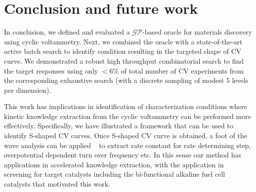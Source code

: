 


\section{Conclusion and future work}
In conclusion, we defined and evaluated a \(\mathcal{GP}\)-based oracle for materials discovery using cyclic voltammetry.
Next, we combined the oracle with a state-of-the-art active batch search to identify condition resulting in the targeted shape of CV curve. 
We demonstrated a robust high throughput combinatorial search to find the target responses using only \(<6\%\) of total number of CV experiments from the corresponding exhaustive search (with a discrete sampling of modest 5 levels per dimension). 

This work has implications in identification of characterization conditions where kinetic knowledge extraction from the cyclic voltammetry can be preformed more effectively. 
Specifically, we have illustrated a framework that can be used to identify S-shaped CV curves. 
Once S-shaped CV curve is obtained, a foot of the wave analysis can be applied ~\cite{FOWA} to extract rate constant for rate determining step, overpotential dependent turn over frequency etc.
In this sense our method has applications in accelerated knowledge extraction, with the application in screening for target catalysts including the bi-functional alkaline fuel cell catalysts that motivated this work.


